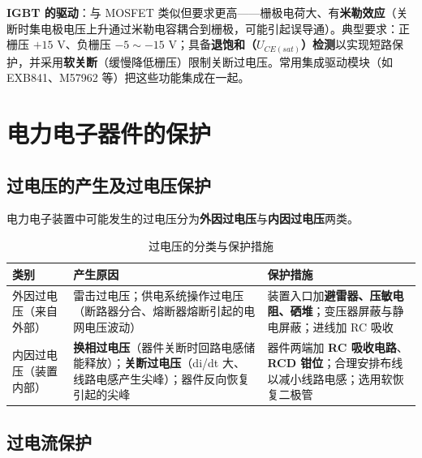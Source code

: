 \textbf{IGBT 的驱动}：与 MOSFET 类似但要求更高——栅极电荷大、有\textbf{米勒效应}（关断时集电极电压上升通过米勒电容耦合到栅极，可能引起误导通）。典型要求：正栅压 $+15$ V、负栅压 $-5\sim-15$ V；具备\textbf{退饱和（$U_{CE(sat)}$）检测}以实现短路保护，并采用\textbf{软关断}（缓慢降低栅压）限制关断过电压。常用集成驱动模块（如 EXB841、M57962 等）把这些功能集成在一起。


\section{电力电子器件的保护}

\subsection{过电压的产生及过电压保护}

电力电子装置中可能发生的过电压分为\textbf{外因过电压}与\textbf{内因过电压}两类。

\begin{table}[htbp]
\centering
\caption{过电压的分类与保护措施}
\label{tab:9-1}
\begin{tabular}{p{2.6cm}p{4.6cm}p{6.4cm}}
\toprule
\textbf{类别} & \textbf{产生原因} & \textbf{保护措施} \\
\midrule
外因过电压（来自外部） & 雷击过电压；供电系统操作过电压（断路器分合、熔断器熔断引起的电网电压波动） & 装置入口加\textbf{避雷器、压敏电阻、硒堆}；变压器屏蔽与静电屏蔽；进线加 RC 吸收 \\
内因过电压（装置内部） & \textbf{换相过电压}（器件关断时回路电感储能释放）；\textbf{关断过电压}（di/dt 大、线路电感产生尖峰）；器件反向恢复引起的尖峰 & 器件两端加 \textbf{RC 吸收电路}、\textbf{RCD 钳位}；合理安排布线以减小线路电感；选用软恢复二极管 \\
\bottomrule
\end{tabular}
\end{table}

\subsection{过电流保护}

